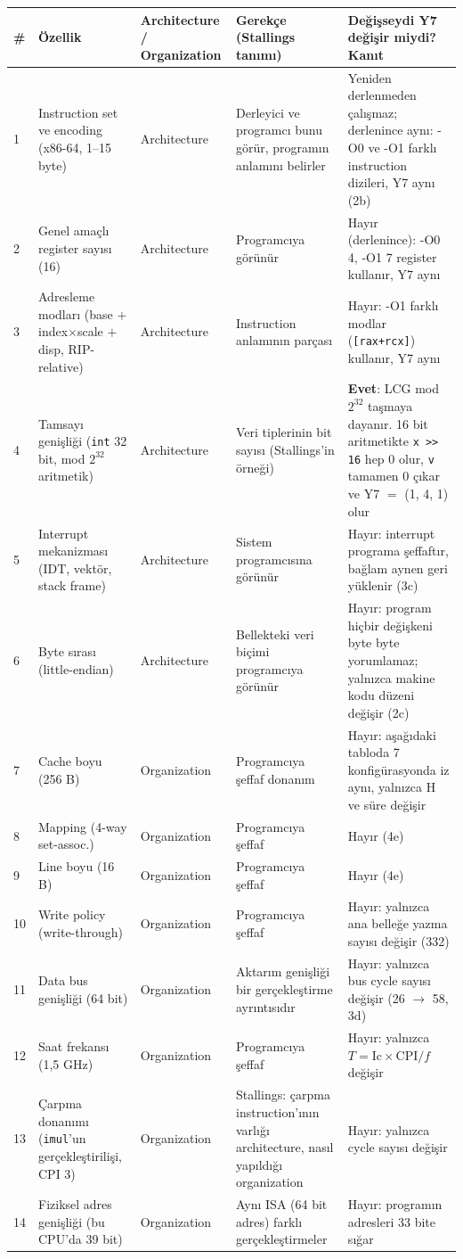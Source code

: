 \documentclass[11pt,a4paper]{article}
\newcommand{\tl}{\texttt}
\newcommand{\hd}[1]{\cellcolor{hdr}#1}
\begin{document}
{\small
\begin{longtable}{|p{0.5cm}|p{3.6cm}|p{2.0cm}|p{3.6cm}|p{5.5cm}|}
\hline
\hd{\#} & \hd{Özellik} & \hd{Architecture / Organization} & \hd{Gerekçe (Stallings tanımı)} & \hd{Değişseydi Y7 değişir miydi? Kanıt}\\
\hline
\endhead
1 & Instruction set ve encoding (x86-64, 1--15 byte) & Architecture & Derleyici ve programcı bunu görür, programın anlamını belirler & Yeniden derlenmeden çalışmaz; derlenince aynı: -O0 ve -O1 farklı instruction dizileri, Y7 aynı (2b)\\ \hline
2 & Genel amaçlı register sayısı (16) & Architecture & Programcıya görünür & Hayır (derlenince): -O0 4, -O1 7 register kullanır, Y7 aynı\\ \hline
3 & Adresleme modları (base $+$ index$\times$scale $+$ disp, RIP-relative) & Architecture & Instruction anlamının parçası & Hayır: -O1 farklı modlar (\tl{[rax+rcx]}) kullanır, Y7 aynı\\ \hline
4 & Tamsayı genişliği (\tl{int} 32 bit, mod $2^{32}$ aritmetik) & Architecture & Veri tiplerinin bit sayısı (Stallings'in örneği) & \textbf{Evet}: LCG mod $2^{32}$ taşmaya dayanır. 16 bit aritmetikte \tl{x >> 16} hep 0 olur, \tl{v} tamamen 0 çıkar ve Y7 $=$ (1, 4, 1) olur\\ \hline
5 & Interrupt mekanizması (IDT, vektör, stack frame) & Architecture & Sistem programcısına görünür & Hayır: interrupt programa şeffaftır, bağlam aynen geri yüklenir (3c)\\ \hline
6 & Byte sırası (little-endian) & Architecture & Bellekteki veri biçimi programcıya görünür & Hayır: program hiçbir değişkeni byte byte yorumlamaz; yalnızca makine kodu düzeni değişir (2c)\\ \hline
7 & Cache boyu (256 B) & Organization & Programcıya şeffaf donanım & Hayır: aşağıdaki tabloda 7 konfigürasyonda iz aynı, yalnızca H ve süre değişir\\ \hline
8 & Mapping (4-way set-assoc.) & Organization & Programcıya şeffaf & Hayır (4e)\\ \hline
9 & Line boyu (16 B) & Organization & Programcıya şeffaf & Hayır (4e)\\ \hline
10 & Write policy (write-through) & Organization & Programcıya şeffaf & Hayır: yalnızca ana belleğe yazma sayısı değişir (332)\\ \hline
11 & Data bus genişliği (64 bit) & Organization & Aktarım genişliği bir gerçekleştirme ayrıntısıdır & Hayır: yalnızca bus cycle sayısı değişir (26 $\to$ 58, 3d)\\ \hline
12 & Saat frekansı (1,5 GHz) & Organization & Programcıya şeffaf & Hayır: yalnızca $T = \text{Ic} \times \text{CPI} / f$ değişir\\ \hline
13 & Çarpma donanımı (\tl{imul}'un gerçekleştirilişi, CPI 3) & Organization & Stallings: çarpma instruction'ının varlığı architecture, nasıl yapıldığı organization & Hayır: yalnızca cycle sayısı değişir\\ \hline
14 & Fiziksel adres genişliği (bu CPU'da 39 bit) & Organization & Aynı ISA (64 bit adres) farklı gerçekleştirmeler & Hayır: programın adresleri 33 bite sığar\\ \hline
\end{longtable}
}
\end{document}
